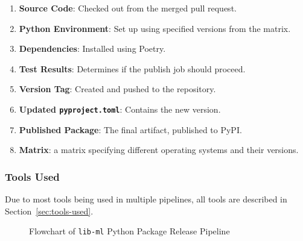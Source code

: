 \begin{enumerate}
    \item \textbf{Source Code}: Checked out from the merged pull request.
    \item \textbf{Python Environment}: Set up using specified versions from the matrix.
    \item \textbf{Dependencies}: Installed using Poetry.
    \item \textbf{Test Results}: Determines if the publish job should proceed.
    \item \textbf{Version Tag}: Created and pushed to the repository.
    \item \textbf{Updated \texttt{pyproject.toml}}: Contains the new version.
    \item \textbf{Published Package}: The final artifact, published to PyPI.
    \item \textbf{Matrix}: a matrix specifying different operating systems and their versions. 
\end{enumerate}

\subsubsection{Tools Used}
Due to most tools being used in multiple pipelines, all tools are described in Section~\ref{sec:tools-used}.


\begin{figure}[h!]
    \centering
    \caption{Flowchart of \texttt{lib-ml} Python Package Release Pipeline}
    \label{fig:lib-ml-pipeline}
\end{figure}

